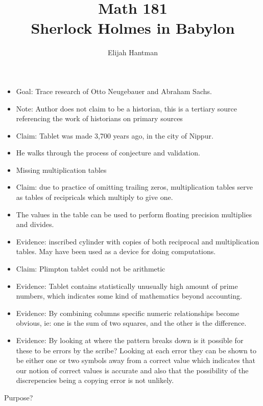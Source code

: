 \documentclass{report}
\title{\Huge{Math 181}\\Sherlock Holmes in Babylon}
\author{\huge{Elijah Hantman}}
\date{}
\begin{document}
\maketitle
\newpage

\begin{itemize}
    \item Goal: Trace research of Otto Neugebauer and
        Abraham Sachs.
    \item Note: Author does not claim to be a historian,
        this is a tertiary source referencing the
        work of historians on primary sources
    \item Claim: Tablet was made 3,700 years ago,
        in the city of Nippur.
    \item He walks through the process of conjecture
        and validation.
    \item Missing multiplication tables
    \item Claim: due to practice of omitting trailing
        zeros, multiplication tables serve as tables
        of recipricals which multiply to give one.
    \item The values in the table can be used to perform
        floating precision multiplies and divides.
    \item Evidence: inscribed cylinder with copies of both
        reciprocal and multiplication tables. May have
        been used as a device for doing computations.
    \item Claim: Plimpton tablet could not be arithmetic
    \item Evidence: Tablet contains statistically unusually
        high amount of prime numbers, which indicates some
        kind of mathematics beyond accounting.
    \item Evidence: By combining columns specific numeric
        relationships become obvious, ie: one is the sum
        of two squares, and the other is the difference.
    \item Evidence: By looking at where the pattern breaks
        down is it possible for these to be errors by the
        scribe? Looking at each error they can be shown to
        be either one or two symbols away from a correct value
        which indicates that our notion of correct values is
        accurate and also that the possibility of the discrepencies
        being a copying error is not unlikely.
\end{itemize}
{\large Purpose?}
\end{document}
